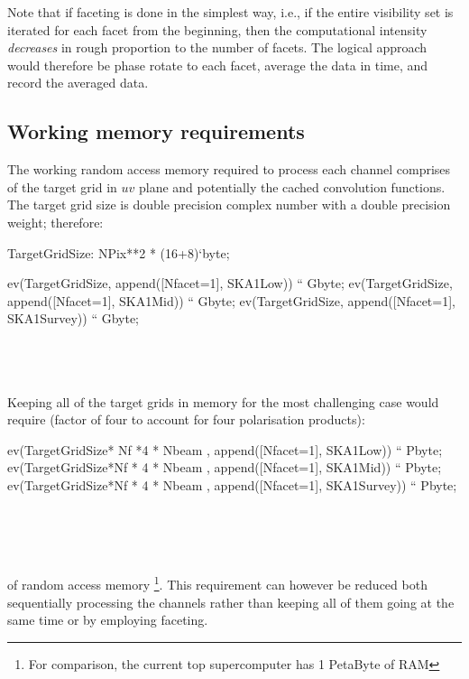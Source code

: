 \documentclass[useAMS,usenatbib,referee]{article}
\begin{document}
Note that if faceting is done in the simplest way, i.e., if the entire
visibility set is iterated for each facet from the beginning, then the
computational intensity \emph{decreases} in rough proportion to the
number of facets. The logical approach would therefore be phase rotate
to each facet, average the data in time, and record the averaged data. 

\subsection{Working memory requirements}

The working random access memory required to process each channel
comprises of the target grid in $uv$ plane and potentially the cached
convolution functions. The target grid size is double precision
complex number with a double precision weight; therefore:

\begin{maxima}[]
TargetGridSize: NPix**2 * (16+8)`byte;

ev(TargetGridSize, append([Nfacet=1], SKA1Low)) `` Gbyte;
ev(TargetGridSize, append([Nfacet=1], SKA1Mid)) `` Gbyte;
ev(TargetGridSize, append([Nfacet=1], SKA1Survey)) `` Gbyte;
\maximaoutput*
{}\; \\
\; \\
\; \\
\; \\
\end{maxima}

Keeping all of the target grids in memory for the most challenging
case would require (factor of four to account for four polarisation
products):
\begin{maxima}[]
ev(TargetGridSize* Nf *4 * Nbeam  , append([Nfacet=1], SKA1Low)) `` Pbyte;
ev(TargetGridSize*Nf * 4 * Nbeam , append([Nfacet=1], SKA1Mid)) `` Pbyte;
ev(TargetGridSize*Nf * 4 * Nbeam , append([Nfacet=1], SKA1Survey)) `` Pbyte;

\maximaoutput*
{}\; \\
\; \\
\; \\
\end{maxima}
of random access memory \footnote{For comparison, the current top supercomputer has 1
  PetaByte of RAM}. This requirement can however be reduced both
sequentially processing the channels rather than keeping all of them
going at the same time or by employing faceting.
\end{document}
